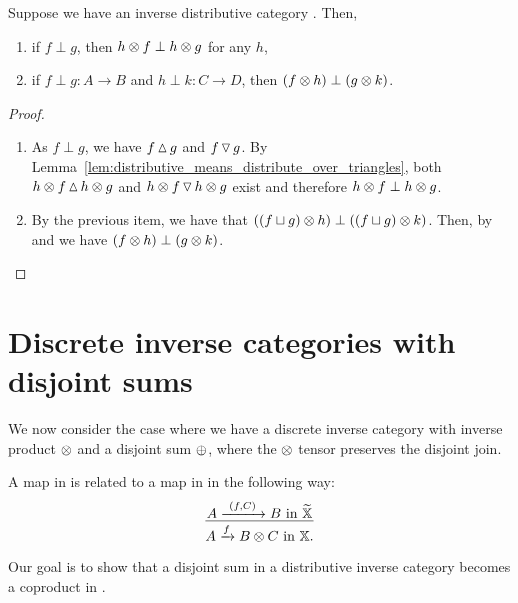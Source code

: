 \begin{corollary}\label{cor:inverse_product_and_disjointness}
  Suppose we have an inverse distributive category \X. Then,
  \begin{enumerate}[{(}i{)}]
    \item if $f \perp g$, then $h\otimes f \perp h\otimes  g$ for any $h$,
    \item  if  $f\perp g : A\to B$ and $h \perp k: C\to D$, then $(f\otimes h)\perp (g\otimes k)$.
   \end{enumerate}
\end{corollary}
\begin{proof}
  \prepprooflist
  \begin{enumerate}[{(}i{)}]
    \item As $f\perp g$, we have $f\operatorname{\vartriangle} g$ and $f\operatorname{\triangledown} g$. By
      Lemma~\ref{lem:distributive_means_distribute_over_triangles}, both $h\otimes f \operatorname{\vartriangle} h\otimes g$ and
      $h\otimes f \operatorname{\triangledown} h\otimes g$ exist and therefore $h\otimes f \perp h\otimes g$.
    \item By the previous item, we have that $((f\sqcup g)\otimes h) \perp ((f\sqcup g)\otimes k)$. Then, by
       and  we have $(f\otimes h)\perp (g\otimes k)$.
  \end{enumerate}
\end{proof}

\section{Discrete inverse categories with disjoint sums} %
\label{sec:discrete_inverse_categories_with_disjoint_sums}

We now consider the case where we have a discrete inverse category with inverse product
 $\otimes$ and a disjoint sum $\oplus$, where the $\otimes$ tensor preserves the disjoint join.

A map in \Xt is related to a map in \X in the following way:
\[
  \infer{A\xrightarrow{f} B\*C \text{ in }\X.}{A \xrightarrow{\ (f,C)\ } B \text{ in } \Xt}
\]

Our goal is to show that a disjoint sum in a distributive inverse category becomes a coproduct
in \Xt.

